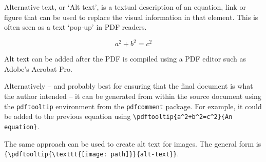Alternative text, or `Alt text', is a textual description of an equation, link or figure that can be used to replace the visual information in that element. This is often seen as a text `pop-up' in PDF readers. %

\begin{equation}
a^2+b^2=c^2
\end{equation}

Alt text can be added after the PDF is compiled using a PDF editor such as Adobe's Acrobat Pro.

Alternatively -- and probably best for ensuring that the final document is what the author intended -- it can be generated from within the source document using the \texttt{pdftooltip} environment from the \texttt{pdfcomment} package. For example, it could be added to
 the previous equation using \verb?\pdftooltip{a^2+b^2=c^2}{An equation}?.

The same approach can be used to create alt text for images. The general form is \verb?{\pdftooltip{\texttt{[image: path]}}{alt-text}}?.

%
